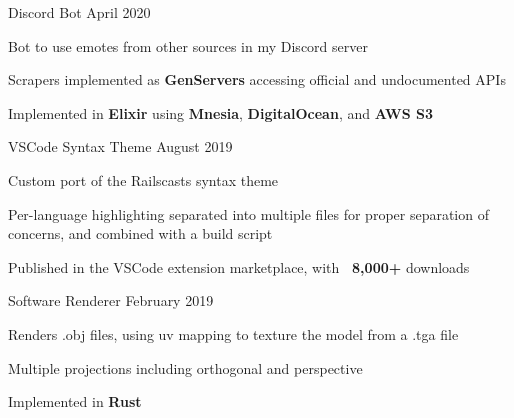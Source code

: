 



\begin{cventries}
    \cventry
    {Discord Bot} %
    {} %
    {}{April 2020}{
        \begin{cvitems} %
            \item {Bot to use emotes from other sources in my Discord server}
            \item {Scrapers implemented as \textbf{GenServers} accessing official and undocumented APIs}
            \item {Implemented in \textbf{Elixir} using \textbf{Mnesia}, \textbf{DigitalOcean}, and \textbf{AWS S3}}
        \end{cvitems}
    }

    \cventry
    {VSCode Syntax Theme} %
    {} %
    {}{August 2019}{
        \begin{cvitems} %
            \item {Custom port of the Railscasts syntax theme}
            \item {Per-language highlighting separated into multiple files for proper separation of concerns, and combined with a build script}
            \item {Published in the VSCode extension marketplace, with \textbf{~8,000+} downloads}
        \end{cvitems}
    }

    \cventry
    {Software Renderer} %
    {} %
    {}{February 2019}{
        \begin{cvitems} %
            \item {Renders .obj files, using uv mapping to texture the model from a .tga file}
            \item {Multiple projections including orthogonal and perspective}
            \item {Implemented in \textbf{Rust}}
        \end{cvitems}
    }


\end{cventries}
